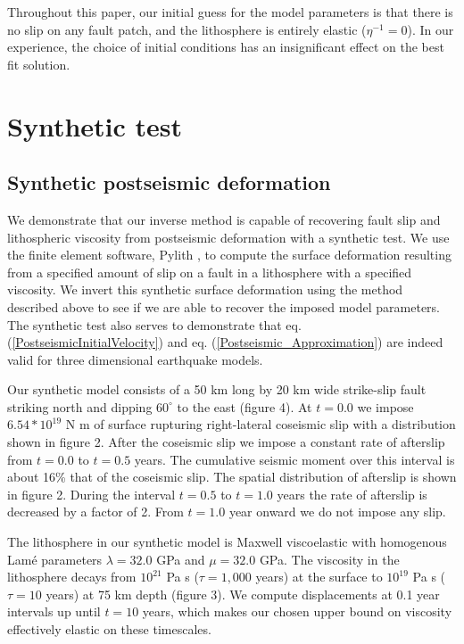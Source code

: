 \documentclass[12pt]{article}
\begin{document}
Throughout this paper, our initial guess for the model parameters is
that there is no slip on any fault patch, and the lithosphere is
entirely elastic ($\eta^{-1} = 0$).  In our experience, the choice of
initial conditions has an insignificant effect on the best fit
solution.

\section{Synthetic test}
\subsection{Synthetic postseismic deformation}

We demonstrate that our inverse method is capable of recovering fault
slip and lithospheric viscosity from postseismic deformation with a
synthetic test.  We use the finite element software, Pylith
\citep{A2007}, to compute the surface deformation resulting from a
specified amount of slip on a fault in a lithosphere with a specified
viscosity.  We invert this synthetic surface deformation using the
method described above to see if we are able to recover the imposed
model parameters.  The synthetic test also serves to demonstrate that
eq. (\ref{PostseismicInitialVelocity}) and
eq. (\ref{Postseismic_Approximation}) are indeed valid for three
dimensional earthquake models.

Our synthetic model consists of a 50 km long by 20 km wide strike-slip
fault striking north and dipping $60^{\circ}$ to the east (figure
4). At $t=0.0$ we impose $6.54*10^{19}$ N m of
surface rupturing right-lateral coseismic slip with a distribution
shown in figure 2.  After the coseismic slip we impose a constant rate
of afterslip from $t=0.0$ to $t=0.5$ years.  The cumulative seismic
moment over this interval is about 16\% that of the coseismic slip.
The spatial distribution of afterslip is shown in figure 2.  During
the interval $t=0.5$ to $t=1.0$ years the rate of afterslip is
decreased by a factor of 2.  From $t=1.0$ year onward we do not impose any
slip.

The lithosphere in our synthetic model is Maxwell viscoelastic with
homogenous Lam\'e parameters $\lambda = 32.0$ GPa and $\mu = 32.0$
GPa.  The viscosity in the lithosphere decays from $10^{21}$ Pa s
($\tau=1,000$ years) at the surface to $10^{19}$ Pa s ($\tau=10$
years) at 75 km depth (figure 3).  We compute displacements at 0.1
year intervals up until $t=10$ years, which makes our chosen upper bound on
viscosity effectively elastic on these timescales.
\end{document}
